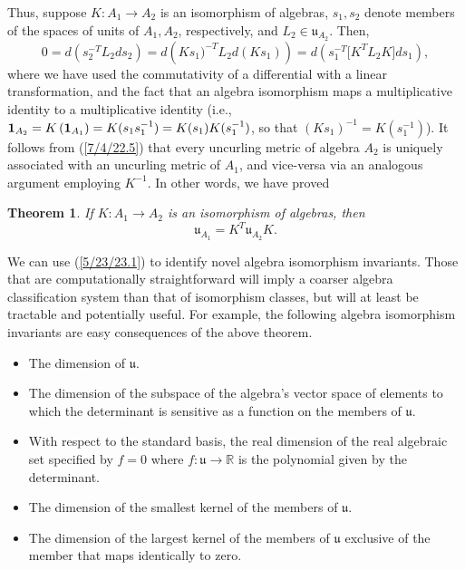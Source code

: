 \documentclass{amsart}
\numberwithin{equation}{section}
\newtheorem{theorem}{Theorem}
\theoremstyle{definition}
\numberwithin{theorem}{section}
\begin{document}
Thus, suppose $K:A_1\rightarrow A_2$ is an isomorphism of algebras, $s_1,s_2$ denote members of the spaces of units of $A_1,A_2$, respectively, and $L_2\in \mathfrak{u}_{A_2}$.  Then, \begin{equation} 0 = d\left(s_2^{-T}L_2 ds_2\right) =  d\left(Ks_1)^{-T}L_2 d(Ks_1)\right) =d\left(s_1^{-T} \big[K^T L_2K\big]ds_1\right), \label{7/4/22.5}  \end{equation} where we have used the commutativity of a differential with a linear transformation, and the fact that an algebra isomorphism maps a multiplicative identity to a multiplicative identity (i.e., ${\bf 1}_{A_2} = K\left(\mathbf{1}_{A_1}\right) = K(s_1s_1^{-1}) = K(s_1)K(s_1^{-1})$, so that $(Ks_1)^{-1} = K(s_1^{-1})$).  It follows from (\ref{7/4/22.5}) that every uncurling metric of algebra $A_2$ is uniquely associated with an uncurling metric of $A_1$, and vice-versa via an analogous argument employing $K^{-1}$.  In other words, we have proved

\begin{theorem} \label{6/6/23.1} If $K:A_1\rightarrow A_2$ is an isomorphism of algebras, then \begin{equation}\label{5/23/23.1} \mathfrak{u}_{A_1} = K^T \mathfrak{u}_{A_2} K. \end{equation} \end{theorem}

We can use (\ref{5/23/23.1}) to identify novel algebra isomorphism invariants. Those that are computationally straightforward will imply a coarser algebra classification system than that of isomorphism classes, but will at least be tractable and potentially useful.  For example, the following algebra isomorphism invariants are easy consequences of the above theorem.   
\begin{itemize} \item The dimension of $\mathfrak{u}$. \item The dimension of the subspace of the algebra's vector space of elements to which the determinant is sensitive as a function on the members of $\mathfrak{u}$. \item With respect to the standard basis, the real dimension of the real algebraic set specified by $f=0$ where $f:\mathfrak{u}\rightarrow \mathbb{R}$ is the polynomial given by the determinant.  \item The dimension of the smallest kernel of the members of $\mathfrak{u}$.  \item The dimension of the largest kernel of the members of $\mathfrak{u}$ exclusive of the member that maps identically to zero.\end{itemize} 
\end{document}
